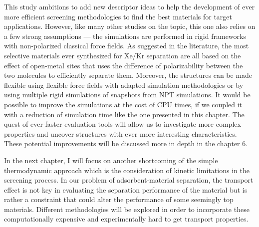 \documentclass[main]{subfiles}
\begin{document}
This study ambitions to add new descriptor ideas to help the development of ever more efficient screening methodologies to find the best materials for target applications. However, like many other studies on the topic, this one also relies on a few strong assumptions --- the simulations are performed in rigid frameworks with non-polarized classical force fields. As suggested in the literature, the most selective materials ever synthesized for Xe/Kr separation are all based on the effect of open-metal sites that uses the difference of polarizability between the two molecules to efficiently separate them.\autocite{Li_2019, Pei_2022} Moreover, the structures can be made flexible using flexible force fields with adapted simulation methodologies\autocite{Bousquet2012} or by using multiple rigid simulations of snapshots from NPT simulations\autocite{Witman_2017}.
It would be possible to improve the simulations at the cost of CPU times, if we coupled it with a reduction of simulation time like the one presented in this chapter. The quest of ever-faster evaluation tools will allow us to investigate more complex properties and uncover structures with ever more interesting characteristics. These potential improvements will be discussed more in depth in the chapter 6.

\vspace{1cm}

In the next chapter, I will focus on another shortcoming of the simple thermodynamic approach which is the consideration of kinetic limitations in the screening process. In our problem of adsorbent-material separation, the transport effect is not key in evaluating the separation performance of the material but is rather a constraint that could alter the performance of some seemingly top materials. Different methodologies will be explored in order to incorporate these computationally expensive and experimentally hard to get transport properties. 

\OnlyInSubfile{\printglobalbibliography}
\end{document}
